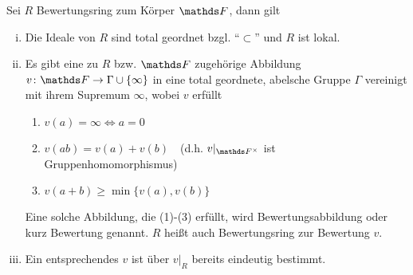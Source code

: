 \documentclass[ngerman,fontsize=11pt, paper=a4, parskip=half, titlepage=true, toc=bib]{scrartcl}
\begin{document}
\begin{Lem}\label{eigbewertungsring}
  Sei $R$ Bewertungsring zum Körper $\F$, dann gilt
  \begin{enumerate}[i)]
  \item Die Ideale von $R$ sind total geordnet bzgl. 
    \enquote{$\subset$} und $R$ ist lokal.
  \item Es gibt eine zu $R$ bzw. $\F$ zugehörige Abbildung
    $v\colon\F\to\Gamma\cup\{\infty\}$ in eine total geordnete, abelsche Gruppe
    $\Gamma$ vereinigt mit ihrem Supremum $\infty$, wobei $v$ erfüllt
    \begin{enumerate}[(1)]
    \item $v(a)=\infty \Longleftrightarrow a=0$
    \item $v(ab)=v(a)+v(b)$~~(d.h. $v|_{\Fx}$ ist Gruppenhomomorphismus)
    \item $v(a+b)\geq \min\{v(a),v(b)\}$
    \end{enumerate}
    Eine solche Abbildung, die (1)-(3) erfüllt,
    wird Bewertungsabbildung oder kurz Bewertung genannt.
    $R$ heißt auch Bewertungsring zur Bewertung $v$.
  \item 
    Ein entsprechendes $v$ ist über $v|_{R}$ bereits eindeutig 
    bestimmt.
  \end{enumerate}


\end{Lem}
\end{document}
